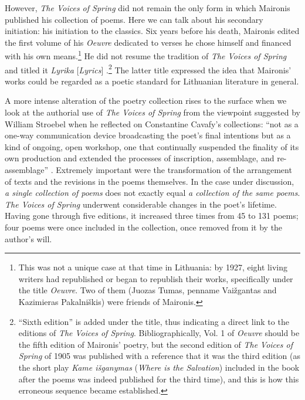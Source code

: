 \begin{paper}
However, \emph{The Voices of Spring} did not remain the only form in
which Maironis published his collection of poems. Here we can talk about
his secondary initiation: his  initiation to the classics. Six years
before his death, Maironis edited the first volume of his \emph{Oeuvre}
dedicated to verses he chose himself and financed with his own means.\footnote{This
  was not a unique case at that time in Lithuania: by 1927, eight
  living writers had republished or began to republish their works,
  specifically under the title \emph{Oeuvre}. Two of them (Juozas Tumas,
  penname Vaižgantas and Kazimieras Pakalniškis) were friends of
  Maironis.} He did not resume the tradition of \emph{The Voices of
Spring} and titled it \emph{Lyrika} [\emph{Lyrics}] \citep{maironis_maironio_1927}.\footnote{``Sixth edition'' is added under the title, thus
  indicating a direct link to the editions of \emph{The} \emph{Voices of
  Spring}. Bibliographically, Vol. 1 of \emph{Oeuvre} should be the
  fifth edition of Maironis' poetry, but the second edition of
  \emph{The} \emph{Voices of Spring} of 1905 was published with a
  reference that it was the third edition (as the short play \emph{Kame
  išganymas} (\emph{Where is the Salvation}) included in the book after
  the poems was indeed published for the third time), and this is how
  this erroneous sequence became established.} The latter title
expressed the idea that Maironis' works could be regarded as a poetic standard for
Lithuanian literature in general.

A more intense alteration of the poetry collection rises to the surface when
we look at the authorial use of \emph{The Voices of Spring} from the
viewpoint suggested by William Stroebel when he reflected on Constantine
Cavafy's collections: ``not as a one-way communication device
broadcasting the poet's final intentions but as a kind of ongoing, open
workshop, one that continually suspended the finality of its own
production and extended the processes of inscription, assemblage, and
re-assemblage'' \citep[280]{stroebel_assembly_2018}. Extremely important were the
transformation of the arrangement of texts and the revisions in the
poems themselves. In the case under discussion, \emph{a single collection of
poems} does not exactly equal \emph{a collection of the same poems}.
\emph{The Voices of Spring} underwent considerable changes in the poet's
lifetime. Having gone through five editions, it increased three times
from 45 to 131 poems; four poems were once included in the collection,
once removed from it by the author's will.


\end{paper}
